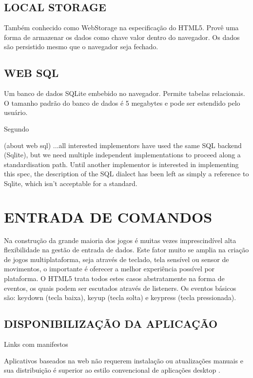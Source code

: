 \documentclass[
12pt,
a4paper,
portuges,
draft
]{report}
\renewenvironment{quote}
               {\list{}{\rightmargin\leftmargin}%
                \item\relax\fontsize{10}{12}}
               {\endlist}
\begin{document}
\subsection{LOCAL STORAGE}
Também conhecido como WebStorage na especificação do HTML5. Provê
uma forma de armazenar os dados como chave valor dentro do navegador. Os
dados são persistido mesmo que o navegador seja fechado.

\subsection{WEB SQL}
Um banco de dados SQLite embebido no navegador. Permite
tabelas relacionais. O tamanho padrão do banco de dados é 5 megabytes
e pode ser estendido pelo usuário.

Segundo \cite{diveIntohtml}
\begin{quote}
(about web sql) ...all interested implementors have used the same
SQL backend (Sqlite), but we need multiple independent
implementations to proceed along a standardisation path. Until
another implementor is interested in implementing this spec, the
description of the SQL dialect has been left as simply a reference
to Sqlite, which isn't acceptable for a standard.
\end{quote}

\section{ENTRADA DE COMANDOS}

Na construção da grande maioria dos jogos é muitas vezes
imprescindível alta flexibilidade na gestão de entrada de dados.
Este fator muito se amplia na criação de jogos multiplataforma,
seja através de teclado, tela sensível ou sensor de movimentos, o
importante é oferecer a melhor experiência possível por plataforma.
O HTML5 trata todos estes casos abstratamente na forma de eventos, os
quais podem ser escutados através de listeners. Os eventos básicos
são: keydown (tecla baixa), keyup (tecla solta) e keypress (tecla
pressionada).

\subsection{DISPONIBILIZAÇÃO DA APLICAÇÃO}

Links com manifestos

Aplicativos baseados na web não requerem instalação ou atualizações manuais e sua distribuição é superior ao estilo convencional de aplicações desktop \autocite{browserGamesTechnologyAndFuture}.
\end{document}
